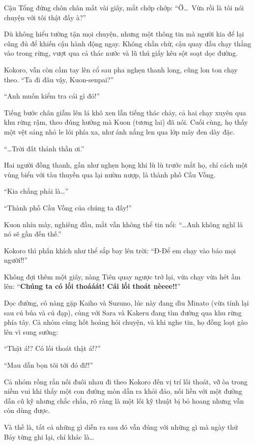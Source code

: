 \documentclass[../main.tex]{subfiles}
\begin{document}
Cậu Tổng đứng chôn chân mất vài giây, mắt chớp chớp: ``Ờ\dots\ Vừa rồi là tôi nói chuyện với tôi thật đấy à?''

Dù không hiểu tường tận mọi chuyện, nhưng một thông tin mà người kia để lại cũng đủ để khiến cậu hành động ngay. Không chần chừ, cậu quay đầu chạy thẳng vào trong rừng, vượt qua cả thác nước và lũ thú giấy kêu sột soạt dọc đường.

Kokoro, vẫn còn cầm tay lên cổ sau pha nghẹn thanh long, cũng lon ton chạy theo. ``Ta đi đâu vậy, Kuon-senpai?''

``Anh muốn kiểm tra cái gì đó!''

Tiếng bước chân giẫm lên lá khô xen lẫn tiếng thác chảy, cả hai chạy xuyên qua khu rừng rậm, theo đúng hướng mà Kuon (tương lai) đã nói. Cuối cùng, họ thấy một vệt sáng nhỏ le lói phía xa, như ánh nắng len qua lớp mây đen dày đặc.

``\dots Trời đất thánh thần ơi.''

Hai người đồng thanh, gần như nghẹn họng khi lù lù trước mắt họ, chỉ cách một vùng biển với tàu thuyền qua lại nườm nượp, là thành phố  Cầu Vồng.

``Kia chẳng phải là\dots''

``Thành phố Cầu Vồng của chúng ta đấy!''

Kuon nhíu mày, nghiêng đầu, mắt vẫn không thể tin nổi: ``\dots Anh không nghĩ là nó sẽ gần đến thế.''

Kokoro thì phấn khích như thể sắp bay lên trời: ``Đ-Để em chạy vào báo mọi người!!''

Không đợi thêm một giây, nàng Tiên quay ngược trở lại, vừa chạy vừa hét ầm lên: ``\textbf{Chúng ta có lối thoááát! Cái lối thoát nèeee!!}''

Dọc đường, cô nàng gặp Kaiho và Suzuno, lúc này đang dìu Minato (vừa tỉnh lại sau cú búa và cú đạp), cùng với Sara và Kakeru đang tìm đường qua khu rừng phía tây. Cả nhóm cùng hốt hoảng hỏi chuyện, và khi nghe tin, họ đồng loạt gào lên vì sung sướng:

``Thật á!? Có lối thoát thật á!?''

``Mau dẫn bọn tôi tới đó đi!!''

Cả nhóm rồng rắn nối đuôi nhau đi theo Kokoro đến vị trí lối thoát, vỡ òa trong niềm vui khi thấy một con đường mòn dẫn ra khỏi đảo, nối liền với một đường dẫn cũ kỹ nhưng chắc chắn, rõ ràng là một lối kỹ thuật bị bỏ hoang nhưng vẫn còn dùng được.

Và thế là, tất cả những gì diễn ra sau đó vẫn đúng với những gì mà ngày thứ Bảy từng ghi lại, chỉ khác là\dots
\end{document}
